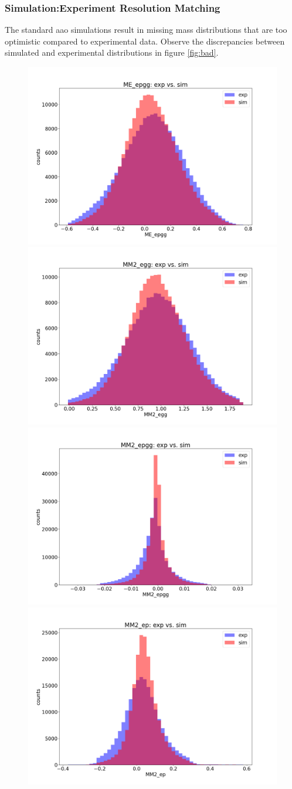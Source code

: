 \subsubsection{Simulation:Experiment Resolution Matching}\label{sec:momsmear}
        
The standard aao simulations result in missing mass distributions that are too optimistic compared to experimental data. Observe the discrepancies between simulated and experimental distributions in figure \ref{fig:bad}. 


\begin{figure}[hbt]
	\centering
	\includegraphics[page=125,width=0.3\linewidth]{Chapters/Ch4-BaseAnalysis/0_preprocessing/0_B_simulation_data_preprocessing/pics/nosmear/outbending_rad_All_All_All_no_smearingME_epgg_exp_vs_sim.png}
	\includegraphics[page=123,width=0.3\linewidth]{Chapters/Ch4-BaseAnalysis/0_preprocessing/0_B_simulation_data_preprocessing/pics/nosmear/outbending_rad_All_All_All_no_smearingMM2_egg_exp_vs_sim.png}
	\includegraphics[page=128,width=0.3\linewidth]{Chapters/Ch4-BaseAnalysis/0_preprocessing/0_B_simulation_data_preprocessing/pics/nosmear/outbending_rad_All_All_All_no_smearingMM2_epgg_exp_vs_sim.png}
	\includegraphics[page=130,width=0.3\linewidth]{Chapters/Ch4-BaseAnalysis/0_preprocessing/0_B_simulation_data_preprocessing/pics/nosmear/outbending_rad_All_All_All_no_smearingMM2_ep_exp_vs_sim.png}

\end{figure}
